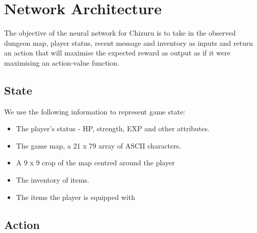 \documentclass[12pt,a4paper]{article}
\begin{document}




    \section{Network Architecture}\label{sec:network-architecture}

    The objective of the neural network for Chizuru is to take in the observed dungeon map, player status, recent message and inventory as inputs and return an action that will maximise the expected reward as output as if it were maximising an action-value function.

    \subsection{State}\label{subsec:state}

    We use the following information to represent game state:
    \begin{itemize}
        \item The player's status - HP, strength, EXP and other attributes.
        \item The game map, a 21 x 79 array of ASCII characters.
        \item A 9 x 9 crop of the map centred around the player
        \item The inventory of items.
        \item The items the player is equipped with
    \end{itemize}

    \subsection{Action}\label{subsec:action}
\end{document}
